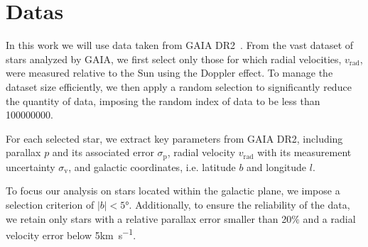 \section{Datas}

In this work we will use data taken from GAIA DR2~\cite{GAIADR2}. From the vast dataset of stars analyzed by GAIA, we first select only those for which radial velocities, $v_{\text{rad}}$, were measured relative to the Sun using the Doppler effect. To manage the dataset size efficiently, we then apply a random selection to significantly reduce the quantity of data, imposing the random index of data to be less than 100000000. 

For each selected star, we extract key parameters from GAIA DR2, including parallax $p$ and its associated error $\sigma_{\text{p}}$, radial velocity $v_{\text{rad}}$ with its measurement uncertainty $\sigma_{\text{v}}$, and galactic coordinates, i.e. latitude $b$ and longitude $l$.

To focus our analysis on stars located within the galactic plane, we impose a selection criterion of $\vert b \vert < 5°$. Additionally, to ensure the reliability of the data, we retain only stars with a relative parallax error smaller than 20$\%$ and a radial velocity error below 5\unit{\kilo\meter\per\second}.
